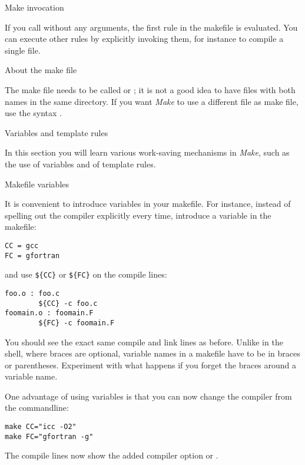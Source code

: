  {Make invocation}

If you call  without any arguments,
the first rule in the makefile is evaluated. You can execute other
rules by explicitly invoking them, for instance  to
compile a single file.


 {About the make file}

The make file needs to be called  or
; it is not a good idea to have files with both names in
the same directory.
If you want \emph{Make} to use a different file as make file, use the
syntax .

 {Variables and template rules}

\begin{purpose}
  In this section you will learn various work-saving mechanisms in
  \emph{Make}, such as the use of variables and of template rules.
\end{purpose}

 {Makefile variables}

It is convenient to introduce variables in your makefile.
For instance, 
instead of spelling out the compiler explicitly every time, introduce a
variable in the makefile:
\begin{verbatim}
CC = gcc
FC = gfortran
\end{verbatim}
and use \verb+${CC}+ or \verb+${FC}+ on the compile lines:
\begin{verbatim}
foo.o : foo.c
        ${CC} -c foo.c
foomain.o : foomain.F
        ${FC} -c foomain.F
\end{verbatim}
  {You should see the exact same compile and link lines as before.}
  {Unlike in the shell, where braces are optional, variable names in a
    makefile have to be in
    braces or parentheses. Experiment with what happens if you forget
    the braces around a variable name.}

One
advantage of using variables is that you can now change the compiler
from the commandline:
\begin{verbatim}
make CC="icc -O2"
make FC="gfortran -g"
\end{verbatim}

  {The compile lines now show the added compiler option  or .}{}

